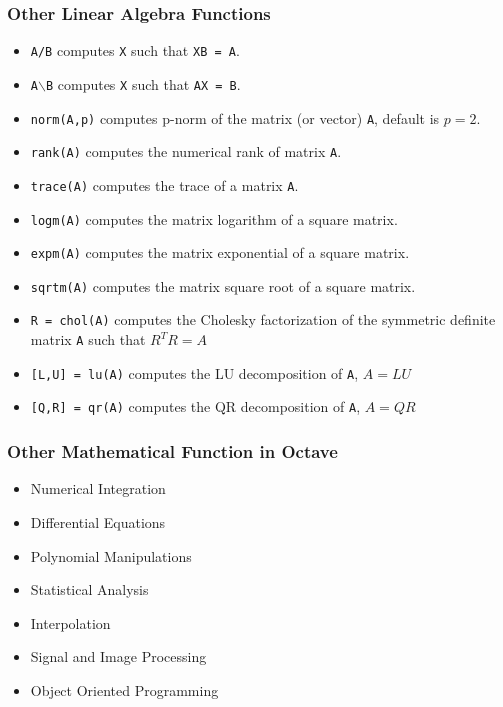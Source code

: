 \documentclass[t,compress,xcolor=svgnames]{beamer}
\begin{document}
\begin{frame}[allowframebreaks]
  \frametitle{\small Other Linear Algebra Functions}
  \begin{itemize}
    \item \texttt{A/B} computes \texttt{X} such that \texttt{XB = A}.
    \item \texttt{A$\backslash$B} computes \texttt{X} such that \texttt{AX = B}.
    \item \texttt{norm(A,p)} computes p-norm of the matrix (or vector) \texttt{A}, default is $p=2$.
    \item \texttt{rank(A)} computes the numerical rank of matrix \texttt{A}.
    \item \texttt{trace(A)} computes the trace of a matrix \texttt{A}.
    \item \texttt{logm(A)} computes the matrix logarithm of a square matrix.
    \item \texttt{expm(A)} computes the matrix exponential of a square matrix.
    \item \texttt{sqrtm(A)} computes the matrix square root of a square matrix.
    \item \texttt{R = chol(A)} computes the Cholesky factorization of the symmetric definite matrix \texttt{A} such that $R^TR =A$
    \item \texttt{[L,U] = lu(A)} computes the LU decomposition of \texttt{A}, $A = LU$
    \item \texttt{[Q,R] = qr(A)} computes the QR decomposition of \texttt{A}, $A = QR$
  \end{itemize}
\end{frame}

\begin{frame}
  \frametitle{\small Other Mathematical Function in Octave}
  \begin{itemize}
    \item Numerical Integration 
    \item Differential Equations
    \item Polynomial Manipulations
    \item Statistical Analysis
    \item Interpolation
    \item Signal and Image Processing
    \item Object Oriented Programming
  \end{itemize}
\end{frame}
\end{document}
